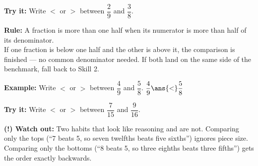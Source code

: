 \documentclass[12pt]{article}
\begin{document}
\begin{tryitbox}
\textbf{Try it:} \quad Write $<$ or $>$ between $\dfrac{2}{9}$ and $\dfrac{3}{8}$.\\[2pt]
\end{tryitbox}


\begin{formulabox}
\textbf{Rule:} A fraction is more than one half when its numerator is more than half of its denominator.\\[3pt]
If one fraction is below one half and the other is above it, the comparison is finished --- no common denominator needed. If both land on the same side of the benchmark, fall back to Skill 2.
\end{formulabox}

\begin{examplebox}
\textbf{Example:} \quad Write $<$ or $>$ between $\dfrac{4}{9}$ and $\dfrac{5}{8}$.
$\dfrac{4}{9} \ans{<} \dfrac{5}{8}$
\end{examplebox}

\begin{tryitbox}
\textbf{Try it:} \quad Write $<$ or $>$ between $\dfrac{7}{15}$ and $\dfrac{9}{16}$.\\[2pt]
\end{tryitbox}

\begin{watchoutbox}
\textbf{(!) Watch out:} Two habits that look like reasoning and are not. Comparing only the tops (``7 beats 5, so seven twelfths beats five sixths'') ignores piece size. Comparing only the bottoms (``8 beats 5, so three eighths beats three fifths'') gets the order exactly backwards.
\end{watchoutbox}
\end{document}
